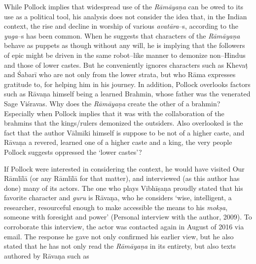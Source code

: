While Pollock implies that widespread use of the \textit{Rāmāyaṇa} can be owed to its use as a political tool, his analysis does not consider the idea that, in the Indian context, the rise and decline in worship of various \textit{avatāra}–s, according to the \textit{yuga}–s has been common. When he suggests that characters of the \textit{Rāmāyaṇa} behave as puppets as though without any will, he is implying that the followers of epic might be driven in the same robot–like manner to demonize non–Hindus and those of lower castes. But he conveniently ignores characters such as Khevaṭ and Śabarī who are not only from the lower strata, but who Rāma expresses gratitude to, for helping him in his journey. In addition, Pollock overlooks factors such as Rāvaṇa himself being a learned Brahmin, whose father was the venerated Sage Viśravas. Why does the \textit{Rāmāyaṇa} create the other of a brahmin? Especially when Pollock implies that it was with the collaboration of the brahmins that the kings/rulers demonized the outsiders. Also overlooked is the fact that the author Vālmīki himself is suppose to be not of a higher caste, and Rāvaṇa a revered, learned one of a higher caste and a king, the very people Pollock suggests oppressed the ‘lower castes’?

If Pollock were interested in considering the context, he would have visited Our Rāmlīlā (or any Rāmlīlā for that matter), and interviewed (as this author has done) many of its actors. The one who plays Vibhīṣaṇa proudly stated that his favorite character and \textit{guru} is Rāvaṇa, who he considers ‘wise, intelligent, a researcher, resourceful enough to make accessible the means to his \textit{mokṣa}, someone with foresight and power’ (Personal interview with the author, 2009). To corroborate this interview, the actor was contacted again in August of 2016 via email. The response he gave not only confirmed his earlier view, but he also stated that he has not only read the \textit{Rāmāyaṇa} in its entirety, but also texts authored by Rāvaṇa such as

